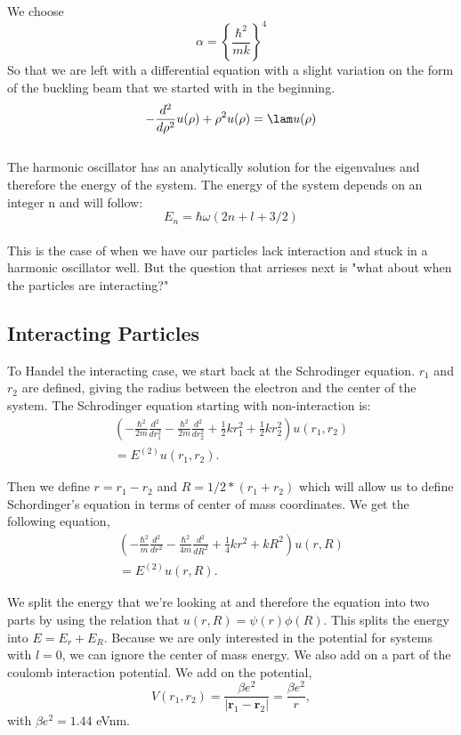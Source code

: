 \documentclass[%
 reprint,
 amsmath,amssymb,
 aps,
]{revtex4-1}
\begin{document}
We choose \[\alpha = \left \{\frac{\hbar^2}{mk}\right \}^4 \]
So that we are left with a differential equation with a slight variation on the form of the buckling beam that we started with in the beginning.
\[ -\frac{d^2}{d\rho^2} u(\rho) + \rho^2 u(\rho) = \lam u(\rho)
\]
\\

The harmonic oscillator has an analytically solution for the eigenvalues and therefore the energy of the system. The energy of the system depends on an integer n and will follow:
\[ E_n = \hbar \omega (2n + l + 3/2) \]
\\

This is the case of when we have our particles lack interaction and stuck in a harmonic oscillator well. But the question that arrieses next is "what about when the particles are interacting?" \\

\subsection{Interacting Particles}
To Handel the interacting case, we start back at the Schrodinger equation. $r_1$ and $r_2$ are defined, giving the radius between the electron and the center of the system. The Schrodinger equation starting with non-interaction is:
\begin{align*}
\left( -\frac{\hbar^2}{2 m} \frac{d^2}{dr_1^2} -\frac{\hbar^2}{2 m} \frac{d^2}{dr_2^2}+ \frac{1}{2}k r_1^2+ \frac{1}{2}k r_2^2\right)u(r_1,r_2) \\
= E^{(2)} u(r_1,r_2) .
\end{align*}


Then we define $r = r_1 - r_2$ and $R = 1/2*(r_1 + r_2)$ which will allow us to define Schordinger's equation in terms of center of mass coordinates. We get the following equation,
\begin{align*}
\left( -\frac{\hbar^2}{m} \frac{d^2}{dr^2} -\frac{\hbar^2}{4 m} \frac{d^2}{dR^2}+ \frac{1}{4} k r^2+ kR^2\right)u(r,R)\\
= E^{(2)} u(r,R).
\end{align*}

We split the energy that we're looking at and therefore the equation into two parts by using the relation that $u(r,R) = \psi(r) \phi (R)$. This splits the energy into $E = E_r + E_R$. Because we are only interested in the potential for systems with $l=0$, we can ignore the center of mass energy. We also add on a part of the coulomb interaction potential. We add on the potential,
\[ V(r_1,r_2) = \frac{\beta e^2}{|\mathbf{r}_1-\mathbf{r}_2|}=\frac{\beta e^2}{r},
\]
with $\beta e^2=1.44$ eVnm. \\
\end{document}
